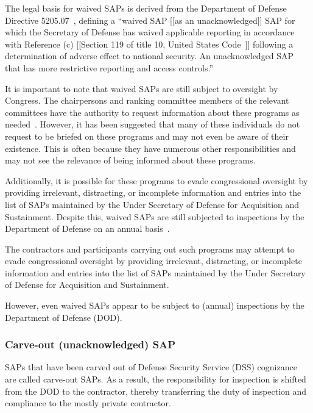 The legal basis for waived SAPs is derived from the Department of Defense Directive 5205.07~\cite{DODDirective5205.07}, defining
a ``waived SAP [[as an unacknowledged]] SAP for which the Secretary of Defense has waived applicable reporting in
accordance with Reference (c) [[Section 119 of title 10, United States Code~\cite{HouseofRepresentatives2021Dec,CornellLaw-10/119-2023Jan}]]
following a determination of adverse effect to national security.
An unacknowledged SAP that has more restrictive reporting and access controls.''

It is important to note that waived SAPs are still subject to oversight by Congress. The chairpersons and ranking committee members of the relevant committees have the authority to request information about these programs as needed~\cite{Dolan-MrX-Disclosure2020Jul}. However, it has been suggested that many of these individuals do not request to be briefed on these programs and may not even be aware of their existence. This is often because they have numerous other responsibilities and may not see the relevance of being informed about these programs.

Additionally, it is possible for these programs to evade congressional oversight by providing irrelevant, distracting, or incomplete information and entries into the list of SAPs maintained by the Under Secretary of Defense for Acquisition and Sustainment. Despite this, waived SAPs are still subjected to inspections by the Department of Defense on an annual basis~\cite{Dolan-MrX-Disclosure2020Jul}.

The contractors and participants carrying out such programs may attempt to evade congressional oversight by providing irrelevant, distracting, or incomplete information and entries into the list of SAPs maintained by the Under Secretary of Defense for Acquisition and Sustainment.

However, even waived SAPs appear to be subject to (annual) inspections by the Department of Defense (DOD).

\subsubsection{Carve-out (unacknowledged) SAP}
\label{2023-UFO-part-Perception-crash-retreivals--cousap}

SAPs that have been carved out of Defense Security Service (DSS) cognizance~\cite{saps2020} are called carve-out SAPs.
As a result, the responsibility for inspection is shifted from the DOD to the contractor, thereby transferring the duty of inspection and compliance to the mostly private contractor.

